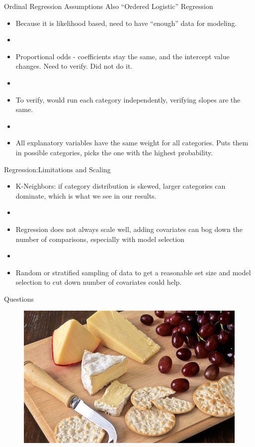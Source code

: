 \documentclass{beamer}
\begin{document}
\begin{frame}{Ordinal Regression Assumptions}
	Also ``Ordered Logistic'' Regression
	\begin{itemize}
	\item Because it is likelihood based, need to have ``enough'' data for modeling.
	\item[]
	\item Proportional odds - coefficients stay the same, and the intercept value changes. Need to verify. Did not do it.
	\item[]
	\item To verify, would run each category independently, verifying slopes are the same.
	\item[]
	\item All explanatory variables have the same weight for all categories. Puts them in possible categories, picks the one with the highest probability. 
	\end{itemize}
\end{frame}

\begin{frame}{Regression:Limitations and Scaling}
	\begin{itemize}
	\item K-Neighbors: if category distribution is skewed, larger categories can dominate, which is what we see in our results.
	\item[]
	\item Regression does not always scale well, adding covariates can bog down the number of comparisons, especially with model selection
	\item[]
	\item Random or stratified sampling of data to get a reasonable set size and model selection to cut down number of covariates could help.
	\end{itemize}
\end{frame}

\begin{frame}{Questions}
	\begin{figure}
		\centering
		\includegraphics[width=\textwidth]{../images/cheese.jpg}
	\end{figure}
\end{frame}
\end{document}
